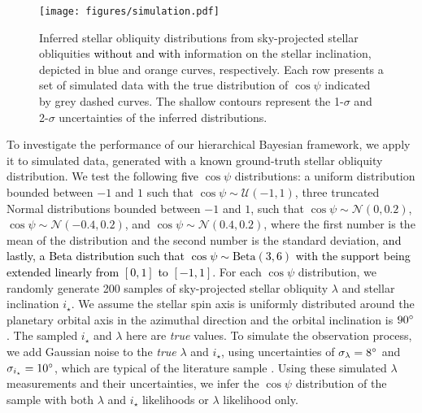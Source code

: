 \documentclass[twocolumn,times]{aastex631}
\newcommand{\edits}[1]{\textcolor{black}{#1}}
\begin{document}
\begin{figure}[ht!]
    \centering
    \texttt{[image: figures/simulation.pdf]}
    \caption{Inferred stellar obliquity distributions from sky-projected stellar obliquities \edits{without and with} information on the stellar inclination, depicted in blue and orange curves, respectively. Each row presents a set of simulated data with the true distribution of $\cos{\psi}$ indicated by grey dashed curves. The shallow contours represent the 1-$\sigma$ and 2-$\sigma$ uncertainties of the inferred distributions.}
    \label{fig:simulation}
\end{figure}

To investigate the performance of our hierarchical Bayesian framework, we apply it to simulated data, generated with a known ground-truth stellar obliquity distribution.
We test the following \edits{five} $\cos{\psi}$ distributions: a uniform distribution bounded between $-1$ and $1$ such that $\cos{\psi} \sim \mathcal{U}(-1,1)$, three truncated Normal distributions bounded between $-1$ and $1$, such that $\cos{\psi} \sim \mathcal{N}(0, 0.2)$, $\cos{\psi} \sim \mathcal{N}(-0.4, 0.2)$, and $\cos{\psi} \sim \mathcal{N}(0.4, 0.2)$, where the first number is the mean of the distribution and the second number is the standard deviation, \edits{and lastly, a Beta distribution such that $\cos{\psi} \sim \mathrm{Beta}(3, 6)$ with the support being extended linearly from $[0, 1]$ to $[-1, 1]$}.
For each $\cos{\psi}$ distribution, we randomly generate 200 samples of sky-projected stellar obliquity $\lambda$ and stellar inclination $i_\star$. We assume the stellar spin axis is uniformly distributed around the planetary orbital axis in the azimuthal direction and the orbital inclination is $90\mbox{$^\circ$}$.
The sampled $i_\star$ and $\lambda$ here are \emph{true} values. 
To simulate the observation process, we add Gaussian noise to the \emph{true} $\lambda$ and $i_\star$, using uncertainties of $\sigma_{\lambda} = 8\mbox{$^\circ$}$ and $\sigma_{i_\star} = 10\mbox{$^\circ$}$, which are typical of the literature sample \cite{Albrecht22}.
Using these simulated $\lambda$ measurements and their uncertainties, we infer the $\cos{\psi}$ distribution of the sample with both $\lambda$ and $i_\star$ likelihoods or $\lambda$ likelihood only.
\end{document}
